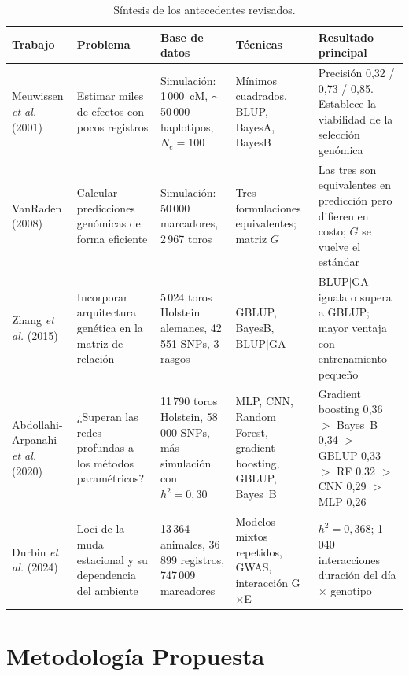 \documentclass[conference]{IEEEtran}
\begin{document}
\begin{table}[!t]
\centering
\caption{Síntesis de los antecedentes revisados.}
\label{tab:sintesis}
\renewcommand{\arraystretch}{1.25}
\footnotesize
\begin{tabular}{p{2.1cm} p{2.9cm} p{3.1cm} p{3.0cm} p{3.4cm}}
\toprule
\textbf{Trabajo} & \textbf{Problema} & \textbf{Base de datos} &
\textbf{Técnicas} & \textbf{Resultado principal} \\
\midrule
Meuwissen \textit{et al.} (2001) \cite{meuwissen2001} &
Estimar miles de efectos con pocos registros &
Simulación: 1\,000~cM, $\sim$50\,000 haplotipos, $N_e = 100$ &
Mínimos cuadrados, BLUP, BayesA, BayesB &
Precisión 0{,}32 / 0{,}73 / 0{,}85. Establece la viabilidad de la
selección genómica \\

VanRaden (2008) \cite{vanraden2008} &
Calcular predicciones genómicas de forma eficiente &
Simulación: 50\,000 marcadores, 2\,967 toros &
Tres formulaciones equivalentes; matriz $G$ &
Las tres son equivalentes en predicción pero difieren en costo; $G$ se
vuelve el estándar \\

Zhang \textit{et al.} (2015) \cite{zhang2015} &
Incorporar arquitectura genética en la matriz de relación &
5\,024 toros Holstein alemanes, 42\,551 SNPs, 3 rasgos &
GBLUP, BayesB, BLUP$|$GA &
BLUP$|$GA iguala o supera a GBLUP; mayor ventaja con entrenamiento
pequeño \\

Abdollahi-Arpanahi \textit{et al.} (2020) \cite{abdollahi2020} &
¿Superan las redes profundas a los métodos paramétricos? &
11\,790 toros Holstein, 58\,000 SNPs, más simulación con $h^2 = 0{,}30$ &
MLP, CNN, Random Forest, gradient boosting, GBLUP, Bayes~B &
Gradient boosting 0{,}36 $>$ Bayes~B 0{,}34 $>$ GBLUP 0{,}33 $>$ RF
0{,}32 $>$ CNN 0{,}29 $>$ MLP 0{,}26 \\

Durbin \textit{et al.} (2024) \cite{durbin2024} &
Loci de la muda estacional y su dependencia del ambiente &
13\,364 animales, 36\,899 registros, 747\,009 marcadores &
Modelos mixtos repetidos, GWAS, interacción G$\times$E &
$h^2 = 0{,}368$; 1\,040 interacciones duración del día $\times$ genotipo \\
\bottomrule
\end{tabular}
\end{table}

\section{Metodología Propuesta}
\end{document}
